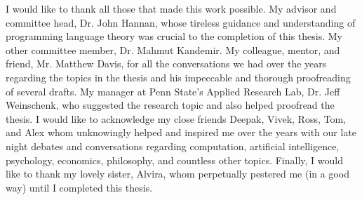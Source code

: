
\acknowledgments  %
I would like to thank all those that made this work possible. My advisor and committee head, Dr. John Hannan, whose tireless guidance and understanding of programming language theory was crucial to the completion of this thesis. My other committee member, Dr. Mahmut Kandemir. My colleague, mentor, and friend, Mr. Matthew Davis, for all the conversations we had over the years regarding the topics in the thesis and his impeccable and thorough proofreading of several drafts. My manager at Penn State's Applied Research Lab, Dr. Jeff Weinschenk, who suggested the research topic and also helped proofread the thesis. I would like to acknowledge my close friends Deepak, Vivek, Ross, Tom, and Alex whom unknowingly helped and inspired me over the years with our late night debates and conversations regarding computation, artificial intelligence, psychology, economics, philosophy, and countless other topics. Finally, I would like to thank my lovely sister, Alvira, whom perpetually pestered me (in a good way) until I completed this thesis.